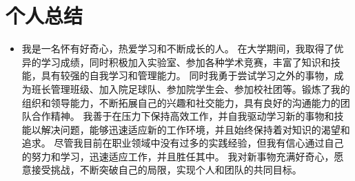 \documentclass{resume}
\begin{document}
\section{个人总结}

\begin{itemize}
  \item 
  我是一名怀有好奇心，热爱学习和不断成长的人。
  在大学期间，我取得了优异的学习成绩，同时积极加入实验室、参加各种学术竞赛，丰富了知识和技能，具有较强的自我学习和管理能力。
  同时我勇于尝试学习之外的事物，成为班长管理班级、加入院足球队、参加院学生会、参加校社团等。锻炼了我的组织和领导能力，不断拓展自己的兴趣和社交能力，具有良好的沟通能力的团队合作精神。
  我善于在压力下保持高效工作，并自我驱动学习新的事物和技能以解决问题，能够迅速适应新的工作环境，并且始终保持着对知识的渴望和追求。
  尽管我目前在职业领域中没有过多的实践经验，但我有信心通过自己的努力和学习，迅速适应工作，并且胜任其中。
  我对新事物充满好奇心，愿意接受挑战，不断突破自己的局限，实现个人和团队的共同目标。
  
  
  
\end{itemize}
\end{document}
